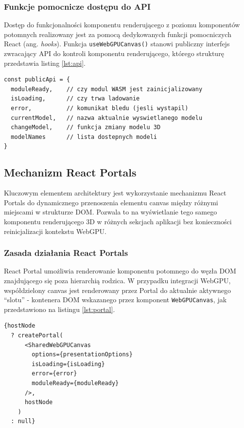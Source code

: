 \subsubsection{Funkcje pomocnicze dostępu do API}

Dostęp do funkcjonalności komponentu renderującego z poziomu komponentów potomnych realizowany jest za pomocą dedykowanych funkcji pomocniczych React (ang. \textit{hooks}). Funkcja \texttt{useWebGPUCanvas()} stanowi publiczny interfejs zwracający API do kontroli komponentu renderującego, którego strukturę przedstawia listing \ref{lst:api}.

\begin{lstlisting}[style=javascript, caption={Publiczne API komponentu renderującego}, label={lst:api}]
const publicApi = {
  moduleReady,    // czy modul WASM jest zainicjalizowany
  isLoading,      // czy trwa ladowanie
  error,          // komunikat bledu (jesli wystapil)
  currentModel,   // nazwa aktualnie wyswietlanego modelu
  changeModel,    // funkcja zmiany modelu 3D
  modelNames      // lista dostepnych modeli
}
\end{lstlisting}

\subsection{Mechanizm React Portals}

Kluczowym elementem architektury jest wykorzystanie mechanizmu React Portals do dynamicznego przenoszenia elementu canvas między różnymi miejscami w strukturze DOM. Pozwala to na wyświetlanie tego samego komponentu renderującego 3D w różnych sekcjach aplikacji bez konieczności reinicjalizacji kontekstu WebGPU.

\subsubsection{Zasada działania React Portals}

React Portal umożliwia renderowanie komponentu potomnego do węzła DOM znajdującego się poza hierarchią rodzica. W przypadku integracji WebGPU, współdzielony canvas jest renderowany przez Portal do aktualnie aktywnego \enquote{slotu} - kontenera DOM wskazanego przez komponent \texttt{WebGPUCanvas}, jak przedstawiono na listingu \ref{lst:portal}.

\begin{lstlisting}[style=javascript, caption={Renderowanie canvas przez Portal}, label={lst:portal}]
{hostNode
  ? createPortal(
      <SharedWebGPUCanvas
        options={presentationOptions}
        isLoading={isLoading}
        error={error}
        moduleReady={moduleReady}
      />,
      hostNode
    )
  : null}
\end{lstlisting}

